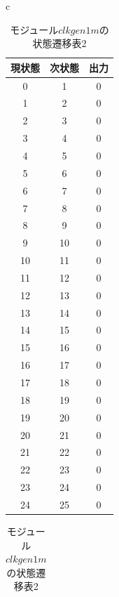 \documentclass[a4paper]{jarticle}
\begin{document}
\begin{table}[H]
	\begin{center}
		\begin{tabular}{c}
			\begin{minipage}{0.5\hsize}
				\begin{center}
					\caption{モジュール$clkgen1m$の状態遷移表1}
					\label{Work18StateTransitionTable1}
					\begin{tabular}{|c|c|c|}
					\hline
					現状態	&次状態	&出力\\	\hline\hline
					0	&1	&0\\	\hline
					1	&2	&0\\	\hline
					2	&3	&0\\	\hline
					3	&4	&0\\	\hline
					4	&5	&0\\	\hline
					5	&6	&0\\	\hline
					6	&7	&0\\	\hline
					7	&8	&0\\	\hline
					8	&9	&0\\	\hline
					9	&10	&0\\	\hline
					10	&11	&0\\	\hline
					11	&12	&0\\	\hline
					12	&13	&0\\	\hline
					13	&14	&0\\	\hline
					14	&15	&0\\	\hline
					15	&16	&0\\	\hline
					16	&17	&0\\	\hline
					17	&18	&0\\	\hline
					18	&19	&0\\	\hline
					19	&20	&0\\	\hline
					20	&21	&0\\	\hline
					21	&22	&0\\	\hline
					22	&23	&0\\	\hline
					23	&24	&0\\	\hline
					24	&25	&0\\	\hline
					\end{tabular}
				\end{center}
			\end{minipage}
			\begin{minipage}{0.5\hsize}
				\begin{center}
					\caption{モジュール$clkgen1m$の状態遷移表2}
					\label{Work18StateTransitionTable2}
					\begin{tabular}{|c|c|c|}

\end{tabular}
\end{center}
\end{minipage}
\end{tabular}
\end{center}
\end{table}
\end{document}
